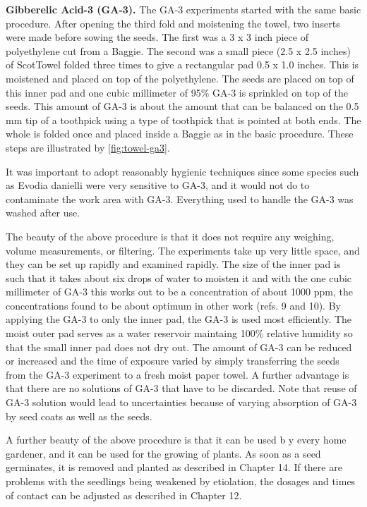 \textbf{Gibberelic Acid-3 (GA-3).} The GA-3 experiments started with the same
basic procedure. After opening the third fold and moistening the towel, two inserts
were made before sowing the seeds. The first was a 3 x 3 inch piece of polyethylene
cut from a Baggie. The second was a small piece (2.5 x 2.5 inches) of ScotTowel
folded three times to give a rectangular pad 0.5 x 1.0 inches. This is moistened and
placed on top of the polyethylene. The seeds are placed on top of this inner pad and
one cubic millimeter of 95\% GA-3 is sprinkled on top of the seeds. This amount of GA-3
is about the amount that can be balanced on the 0.5 mm tip of a toothpick using a
type of toothpick that is pointed at both ends. The whole is folded once and placed
inside a Baggie as in the basic procedure. These steps are illustrated by \ref{fig:towel-ga3}.



It was important to adopt reasonably hygienic techniques since some species
such as Evodia danielli were very sensitive to GA-3, and it would not do to
contaminate the work area with GA-3. Everything used to handle the GA-3 was
washed after use.

The beauty of the above procedure is that it does not require any weighing,
volume measurements, or filtering. The experiments take up very little space, and they
can be set up rapidly and examined rapidly. The size of the inner pad is such that it
takes about six drops of water to moisten it and with the one cubic millimeter of GA-3
this works out to be a concentration of about 1000 ppm, the concentrations found to be
about optimum in other work (refs. 9 and 10). By applying the GA-3 to only the inner
pad, the GA-3 is used most efficiently. The moist outer pad serves as a water reservoir
maintaing 100\% relative humidity so that the small inner pad does not dry out. The
amount of GA-3 can be reduced or increased and the time of exposure varied by
simply transferring the seeds from the GA-3 experiment to a fresh moist paper towel. A
further advantage is that there are no solutions of GA-3 that have to be discarded.
Note that reuse of GA-3 solution would lead to uncertainties because of varying
absorption of GA-3 by seed coats as well as the seeds.

A further beauty of the above procedure is that it can be used b y every home
gardener, and it can be used for the growing of plants. As soon as a seed germinates,
it is removed and planted as described in Chapter 14. If there are problems with the
seedlings being weakened by etiolation, the dosages and times of contact can be
adjusted as described in Chapter 12.

